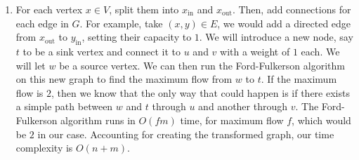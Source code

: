 \documentclass{article}
\begin{document}
\begin{solution}
\begin{enumerate}[label = (\alph*)]
\item For each vertex $x \in V$, split them into $x_\text{in}$ and $x_\text{out}$. Then, add connections for each edge in $G$. For example, take $(x, y) \in E$, we would add a directed edge from $x_\text{out}$ to $y_\text{in}$, setting their capacity to $1$. We will introduce a new node, say $t$ to be a sink vertex and connect it to $u$ and $v$ with a weight of $1$ each. We will let $w$ be a source vertex. We can then run the Ford-Fulkerson algorithm on this new graph to find the maximum flow from $w$ to $t$. If the maximum flow is $2$, then we know that the only way that could happen is if there exists a simple path between $w$ and $t$ through $u$ and another through $v$. The Ford-Fulkerson algorithm runs in $O(fm)$ time, for maximum flow $f$, which would be $2$ in our case. Accounting for creating the transformed graph, our time complexity is $O(n + m)$.
\end{enumerate}
\end{solution}
\end{document}
